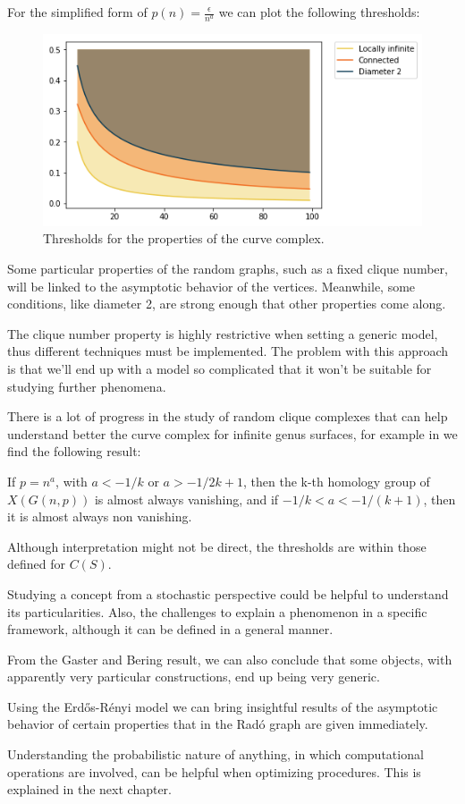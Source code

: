 For the simplified form of $p(n) = \frac{\epsilon}{n^{a}}$ we can plot the following thresholds:

\begin{figure}[h!]
	\centering
	\includegraphics[scale=0.7]{Python/Figures/ER-thresholds.png}
	\caption{Thresholds for the properties of the curve complex.}
\end{figure}

Some particular properties of the random graphs, such as a fixed clique number, will be linked to the asymptotic behavior of the vertices. Meanwhile, some conditions, like diameter 2, are strong enough that other properties come along.

The clique number property is highly restrictive when setting a generic model, thus different techniques must be implemented. The problem with this approach is that we'll end up with a model so complicated that it won't be suitable for studying further phenomena.

There is a lot of progress in the study of random clique complexes that can help understand better the curve complex for infinite genus surfaces, for example in \cite[Khale,09]{kahle2009topology} we find the following result:
\begin{theorem}
If $p=n^{a}$, with $a < -1/k$ or
$a > -1/2k+1$, then the k-th homology group of $X(G(n, p))$ is almost always vanishing, and if $-1/k < a < -1/(k + 1)$, then it is almost always non vanishing.
\end{theorem}
Although interpretation might not be direct, the thresholds are within those defined for $C(S)$.

Studying a concept from a stochastic perspective could be helpful to understand its particularities. Also, the challenges to explain a phenomenon in a specific framework, although it can be defined in a general manner.

From the Gaster and Bering result, we can also conclude that some objects, with apparently very particular constructions, end up being very generic.

Using the Erdős-Rényi model we can bring insightful results of the asymptotic behavior of certain properties that in the Radó graph are given immediately.

Understanding the probabilistic nature of anything, in which computational operations are involved, can be helpful when optimizing procedures. This is explained in the next chapter.